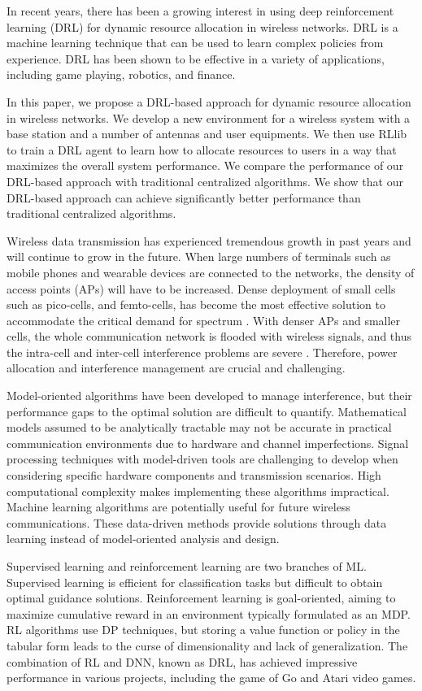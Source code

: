 \documentclass[conference]{IEEEtran}
\begin{document}
In recent years, there has been a growing interest in using deep reinforcement learning (DRL) for dynamic resource allocation in wireless networks. DRL is a machine learning technique that can be used to learn complex policies from experience. DRL has been shown to be effective in a variety of applications, including game playing, robotics, and finance.

In this paper, we propose a DRL-based approach for dynamic resource allocation in wireless networks. We develop a new environment for a wireless system with a base station and a number of antennas and user equipments. We then use RLlib to train a DRL agent to learn how to allocate resources to users in a way that maximizes the overall system performance.
We compare the performance of our DRL-based approach with traditional centralized algorithms. We show that our DRL-based approach can achieve significantly better performance than traditional centralized algorithms.

Wireless data transmission has experienced tremendous growth in past years and will continue to grow in the future. When large numbers of terminals such as mobile phones and wearable devices are connected to the networks, the density of access points (APs) will have to be increased. Dense deployment of small cells such as pico-cells, and femto-cells, has become the most effective solution to accommodate the critical demand for spectrum \cite{ohdeep}.
With denser APs and smaller cells, the whole communication network is flooded with wireless signals, and thus the intra-cell and inter-cell interference problems are severe \cite{zhao2019deep}. Therefore, power allocation and interference management are crucial and challenging.

Model-oriented algorithms have been developed to manage interference, but their performance gaps to the optimal solution are difficult to quantify. Mathematical models assumed to be analytically tractable may not be accurate in practical communication environments due to hardware and channel imperfections. Signal processing techniques with model-driven tools are challenging to develop when considering specific hardware components and transmission scenarios. High computational complexity makes implementing these algorithms impractical. Machine learning algorithms are potentially useful for future wireless communications. These data-driven methods provide solutions through data learning instead of model-oriented analysis and design.

Supervised learning and reinforcement learning are two branches of ML. Supervised learning is efficient for classification tasks but difficult to obtain optimal guidance solutions. Reinforcement learning is goal-oriented, aiming to maximize cumulative reward in an environment typically formulated as an MDP. RL algorithms use DP techniques, but storing a value function or policy in the tabular form leads to the curse of dimensionality and lack of generalization. The combination of RL and DNN, known as DRL, has achieved impressive performance in various projects, including the game of Go and Atari video games.
\end{document}

